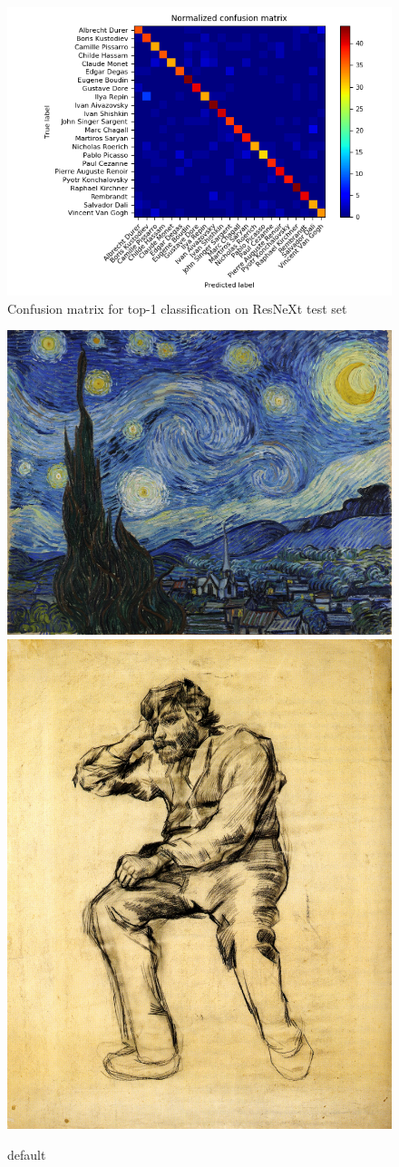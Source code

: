 \documentclass{article}
\begin{document}
\begin{figure}
	\centering
	\includegraphics[width=0.8\linewidth]{graphs/confusion}
	\caption{Confusion matrix for top-1 classification on ResNeXt test set}
	\label{fig:confusion}
\end{figure}


\begin{figure}[htp]
	
	\centering
	\includegraphics[width=.5\textwidth]{image/1280px-Van_Gogh_-_Starry_Night_-_Google_Art_Project}\hfill
	\includegraphics[height=.5\textwidth]{image/vincent-van-gogh_seated-man-with-a-beard-1886-1}
	
	\caption{default}
	\label{fig:vangogh}
	
\end{figure}
\end{document}
